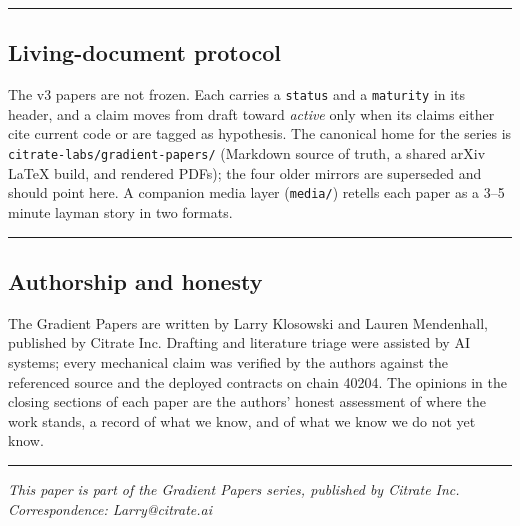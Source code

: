 \begin{center}\rule{0.5\linewidth}{0.5pt}\end{center}

\subsection{Living-document protocol}\label{living-document-protocol}

The v3 papers are not frozen. Each carries a \texttt{status} and a
\texttt{maturity} in its header, and a claim moves from draft toward
\emph{active} only when its claims either cite current code or are
tagged as hypothesis. The canonical home for the series is
\texttt{citrate-labs/gradient-papers/} (Markdown source of truth, a
shared arXiv LaTeX build, and rendered PDFs); the four older mirrors are
superseded and should point here. A companion media layer
(\texttt{media/}) retells each paper as a 3--5 minute layman story in
two formats.

\begin{center}\rule{0.5\linewidth}{0.5pt}\end{center}

\subsection{Authorship and honesty}\label{authorship-and-honesty}

The Gradient Papers are written by Larry Klosowski and Lauren
Mendenhall, published by Citrate Inc. Drafting and literature triage
were assisted by AI systems; every mechanical claim was verified by the
authors against the referenced source and the deployed contracts on
chain 40204. The opinions in the closing sections of each paper are the
authors' honest assessment of where the work stands, a record of what we
know, and of what we know we do not yet know.

\begin{center}\rule{0.5\linewidth}{0.5pt}\end{center}

\emph{This paper is part of the Gradient Papers series, published by
Citrate Inc.} \emph{Correspondence: Larry@citrate.ai}
